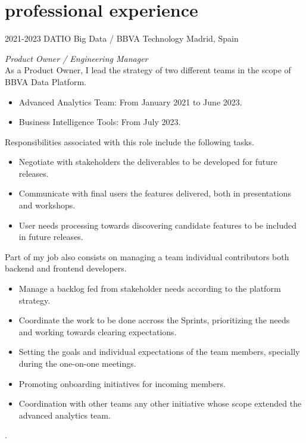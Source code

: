 \documentclass[]{friggeri-cv}
\begin{document}
\clearpage
\section{professional experience}

\begin{entrylist}
\entry
{2021-2023}
{DATIO Big Data} / {BBVA Technology}
{Madrid, Spain}
{\emph{Product Owner / Engineering Manager} \\
{As a Product Owner, I lead the strategy of two different teams in the scope of BBVA Data Platform.}
\begin{itemize}
  \item Advanced Analytics Team: From January 2021 to June 2023.
  \item Business Intelligence Tools: From July 2023.
\end{itemize}
{Responsibilities associated with this role include the following tasks.}
\begin{itemize}
  \item Negotiate with stakeholders the deliverables to be developed for future releases.
  \item Communicate with final users the features delivered, both in presentations and workshops.
  \item User needs processing towards discovering candidate features to be included in future releases.
\end{itemize}
Part of my job also consists on managing a team individual contributors both backend and frontend developers.
\begin{itemize}
  \item Manage a backlog fed from stakeholder needs according to the platform strategy.
  \item Coordinate the work to be done accross the Sprints, prioritizing the needs and working towards clearing expectations.
  \item Setting the goals and individual expectations of the team members, specially during the one-on-one meetings.
  \item Promoting onboarding initiatives for incoming members.
  \item Coordination with other teams any other initiative whose scope extended the advanced analytics team.
\end{itemize}.}

\end{entrylist}
\end{document}
